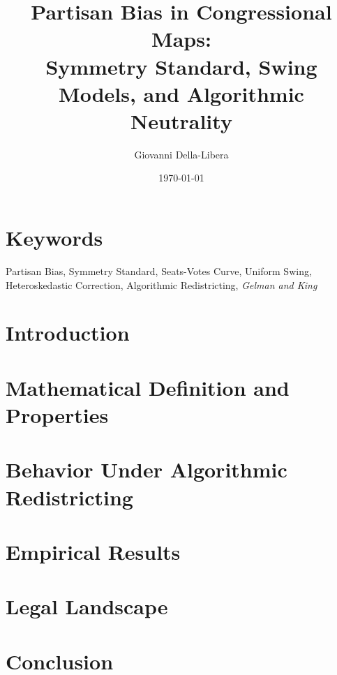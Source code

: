 \documentclass[12pt]{article}
\title{\textbf{Partisan Bias in Congressional Maps:\\
Symmetry Standard, Swing Models, and Algorithmic Neutrality}}
\author{Giovanni Della-Libera}
\date{\today}
\begin{document}
\maketitle

\begin{abstract}

\end{abstract}

\section*{Keywords}
Partisan Bias, Symmetry Standard, Seats-Votes Curve, Uniform Swing, Heteroskedastic
Correction, Algorithmic Redistricting, \textit{Gelman and King}

\section{Introduction}


\section{Mathematical Definition and Properties}


\section{Behavior Under Algorithmic Redistricting}


\section{Empirical Results}


\section{Legal Landscape}


\section{Conclusion}




\end{document}
